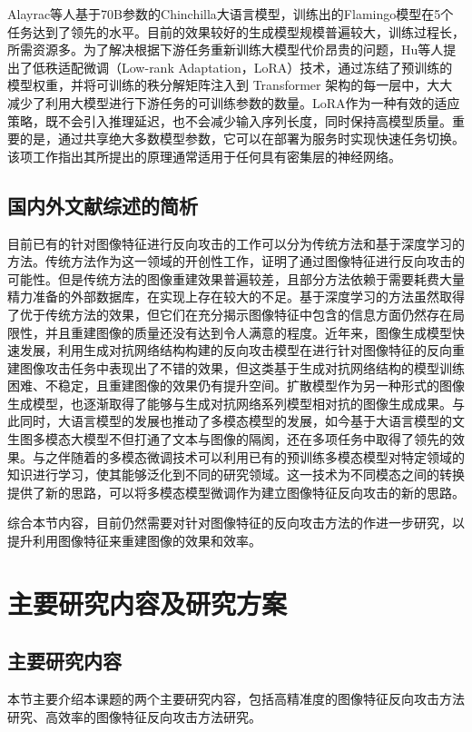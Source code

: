 Alayrac\cite{NEURIPS2022_960a172b}等人基于70B参数的Chinchilla大语言模型，训练出的Flamingo模型在5个任务达到了领先的水平。目前的效果较好的生成模型规模普遍较大，训练过程长，所需资源多。为了解决根据下游任务重新训练大模型代价昂贵的问题，Hu\cite{hu2021loralowrankadaptationlarge}等人提出了低秩适配微调（Low-rank Adaptation，LoRA）技术，通过冻结了预训练的模型权重，并将可训练的秩分解矩阵注入到 Transformer 架构的每一层中，大大减少了利用大模型进行下游任务的可训练参数的数量。LoRA作为一种有效的适应策略，既不会引入推理延迟，也不会减少输入序列长度，同时保持高模型质量。重要的是，通过共享绝大多数模型参数，它可以在部署为服务时实现快速任务切换。该项工作指出其所提出的原理通常适用于任何具有密集层的神经网络。

\subsection{国内外文献综述的简析}
目前已有的针对图像特征进行反向攻击的工作可以分为传统方法和基于深度学习的方法。传统方法作为这一领域的开创性工作，证明了通过图像特征进行反向攻击的可能性。但是传统方法的图像重建效果普遍较差，且部分方法依赖于需要耗费大量精力准备的外部数据库，在实现上存在较大的不足。基于深度学习的方法虽然取得了优于传统方法的效果，但它们在充分揭示图像特征中包含的信息方面仍然存在局限性，并且重建图像的质量还没有达到令人满意的程度。近年来，图像生成模型快速发展，利用生成对抗网络结构构建的反向攻击模型在进行针对图像特征的反向重建图像攻击任务中表现出了不错的效果，但这类基于生成对抗网络结构的模型训练困难、不稳定，且重建图像的效果仍有提升空间。扩散模型作为另一种形式的图像生成模型，也逐渐取得了能够与生成对抗网络系列模型相对抗的图像生成成果。与此同时，大语言模型的发展也推动了多模态模型的发展，如今基于大语言模型的文生图多模态大模型不但打通了文本与图像的隔阂，还在多项任务中取得了领先的效果。与之伴随着的多模态微调技术可以利用已有的预训练多模态模型对特定领域的知识进行学习，使其能够泛化到不同的研究领域。这一技术为不同模态之间的转换提供了新的思路，可以将多模态模型微调作为建立图像特征反向攻击的新的思路。
\par
综合本节内容，目前仍然需要对针对图像特征的反向攻击方法的作进一步研究，以提升利用图像特征来重建图像的效果和效率。
\section{主要研究内容及研究方案}
\subsection{主要研究内容}
本节主要介绍本课题的两个主要研究内容，包括高精准度的图像特征反向攻击方法研究、高效率的图像特征反向攻击方法研究。
